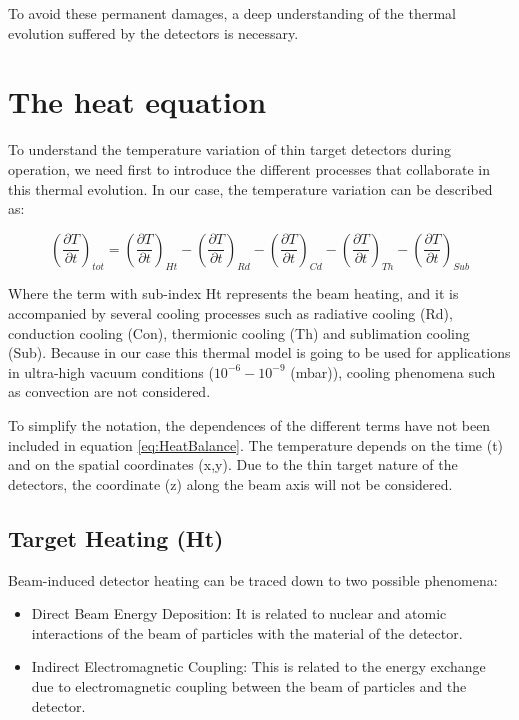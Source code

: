 To avoid these permanent damages, a deep understanding of the thermal evolution suffered by the detectors is necessary. 

\section{The heat equation}

To understand the temperature variation of thin target detectors during operation, we need first to introduce the different processes that collaborate in this thermal evolution. In our case, the temperature variation can be described as: 

\begin{equation}
    \left(\frac{\partial T}{\partial t}\right)_{tot} = \left(\frac{\partial T}{\partial t}\right)_{Ht} - \left(\frac{\partial T}{\partial t}\right)_{Rd} - 
                 \left(\frac{\partial T}{\partial t}\right)_{Cd} - \left(\frac{\partial T}{\partial t}\right)_{Th} - \left(\frac{\partial T}{\partial t}\right)_{Sub}
    \label{eq:HeatBalance}
\end{equation}

Where the term with sub-index Ht represents the beam heating, and it is accompanied by several cooling processes such as radiative cooling (Rd), conduction cooling (Con), thermionic cooling (Th) and sublimation cooling (Sub). Because in our case this thermal model is going to be used for applications in ultra-high vacuum conditions ($10^{-6} - 10^{-9}$ (mbar)), cooling phenomena such as convection are not considered. 

To simplify the notation, the dependences of the different terms have not been included in equation \ref{eq:HeatBalance}. The temperature depends on the time (t) and on the spatial coordinates (x,y). Due to the thin target nature of the detectors, the coordinate (z) along the beam axis will not be considered. 

\subsection{Target Heating (Ht)}

Beam-induced detector heating can be traced down to two possible phenomena: 

\begin{itemize}
    \item Direct Beam Energy Deposition: It is related to nuclear and atomic interactions of the beam of particles with the material of the detector. 
    \item Indirect Electromagnetic Coupling: This is related to the energy exchange due to electromagnetic coupling between the beam of particles and the detector. 
\end{itemize}

